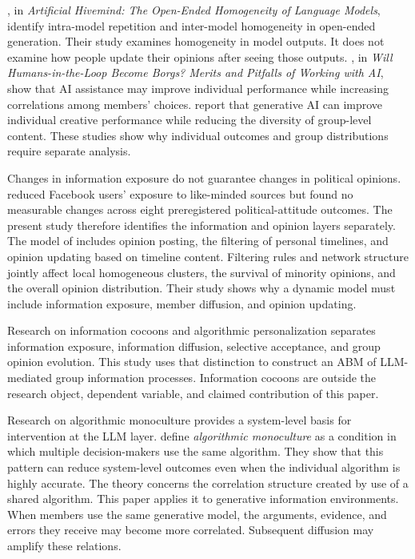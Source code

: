 \documentclass[11pt,a4paper]{article}
\newcommand{\term}[1]{\textit{#1}}
\begin{document}
\citet{jiang2025}, in \emph{Artificial Hivemind: The Open-Ended Homogeneity of Language Models}, identify intra-model repetition and inter-model homogeneity in open-ended generation. Their study examines homogeneity in model outputs. It does not examine how people update their opinions after seeing those outputs. \citet{fugener2021}, in \emph{Will Humans-in-the-Loop Become Borgs? Merits and Pitfalls of Working with AI}, show that AI assistance may improve individual performance while increasing correlations among members' choices. \citet{doshi2024} report that generative AI can improve individual creative performance while reducing the diversity of group-level content. These studies show why individual outcomes and group distributions require separate analysis.

Changes in information exposure do not guarantee changes in political opinions. \citet{nyhan2023} reduced Facebook users' exposure to like-minded sources but found no measurable changes across eight preregistered political-attitude outcomes. The present study therefore identifies the information and opinion layers separately. The model of \citet{perra2019} includes opinion posting, the filtering of personal timelines, and opinion updating based on timeline content. Filtering rules and network structure jointly affect local homogeneous clusters, the survival of minority opinions, and the overall opinion distribution. Their study shows why a dynamic model must include information exposure, member diffusion, and opinion updating.

Research on information cocoons and algorithmic personalization separates information exposure, information diffusion, selective acceptance, and group opinion evolution. This study uses that distinction to construct an ABM of LLM-mediated group information processes. Information cocoons are outside the research object, dependent variable, and claimed contribution of this paper.

Research on algorithmic monoculture provides a system-level basis for intervention at the LLM layer. \citet{kleinberg2021} define \term{algorithmic monoculture} as a condition in which multiple decision-makers use the same algorithm. They show that this pattern can reduce system-level outcomes even when the individual algorithm is highly accurate. The theory concerns the correlation structure created by use of a shared algorithm. This paper applies it to generative information environments. When members use the same generative model, the arguments, evidence, and errors they receive may become more correlated. Subsequent diffusion may amplify these relations.
\end{document}
